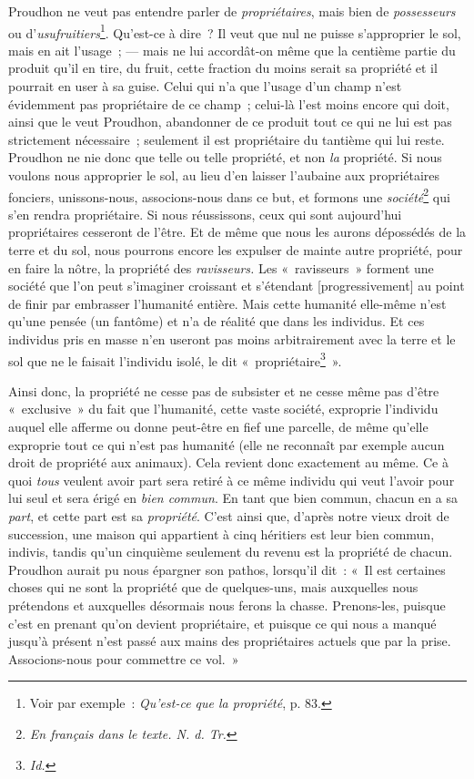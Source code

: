 \documentclass[french,twoside]{book} %
\newcommand\corr[1]{#1}
\begin{document}
Proudhon ne veut pas entendre parler de \emph{propriétaires}, mais bien de \emph{possesseurs} ou d’\emph{usufruitiers}\footnote{ \noindent Voir par exemple : \emph{Qu’est-ce que la propriété}, p. 83.
 }.  Qu’est-ce à dire ? Il veut que nul ne puisse s’approprier le sol, mais en ait l’usage ; — mais ne lui accordât-on même que la centième partie du produit qu’il en tire, du fruit, cette fraction du moins serait sa propriété et il pourrait en user à sa guise. Celui qui n’a que l’usage d’un champ n’est évidemment pas propriétaire de ce champ ; celui-là l’est moins encore qui doit, ainsi que le veut Proudhon, abandonner de ce produit tout ce qui ne lui est pas strictement nécessaire ; seulement il est propriétaire du tantième qui lui reste. Proudhon ne nie donc que telle ou telle propriété, et non \emph{la} propriété. Si nous voulons nous approprier le sol, au lieu d’en laisser l’aubaine aux propriétaires fonciers, unissons-nous, associons-nous dans ce but, et formons une \emph{société}\footnote{ \noindent \emph{En français dans le texte. N. d. Tr.}
 } qui s’en rendra propriétaire. Si nous réussissons, ceux qui sont aujourd’hui propriétaires cesseront de l’être. Et de même que nous les aurons dépossédés de la terre et du sol, nous pourrons encore les expulser de mainte autre propriété, pour en faire la nôtre, la propriété des \emph{ravisseurs.} Les « ravisseurs » forment une société que l’on peut s’imaginer croissant et s’étendant [{\corr progressivement}] au point de finir par embrasser l’humanité entière. Mais cette humanité elle-même n’est qu’une pensée (un fantôme) et n’a de réalité que dans les individus. Et ces individus pris en masse n’en useront pas moins arbitrairement avec la terre et le sol que ne le faisait l’individu isolé, le dit « propriétaire\footnote{ \noindent \emph{Id.}
 } ».\par
Ainsi donc, la propriété ne cesse pas de subsister et ne cesse même pas d’être « exclusive » du fait que l’humanité, cette vaste société, exproprie l’individu auquel elle afferme ou donne peut-être en fief une parcelle, de même qu’elle exproprie tout ce qui n’est pas humanité (elle ne reconnaît par exemple aucun droit de propriété aux animaux). Cela revient donc exactement  au même. Ce à quoi \emph{tous} veulent avoir part sera retiré à ce même individu qui veut l’avoir pour lui seul et sera érigé en \emph{bien commun}. En tant que bien commun, chacun en a sa \emph{part}, et cette part est sa \emph{propriété}. C’est ainsi que, d’après notre vieux droit de succession, une maison qui appartient à cinq héritiers est leur bien commun, indivis, tandis qu’un cinquième seulement du revenu est la propriété de chacun. Proudhon aurait pu nous épargner son pathos, lorsqu’il dit : « Il est certaines choses qui ne sont la propriété que de quelques-uns, mais auxquelles nous prétendons et auxquelles désormais nous ferons la chasse. Prenons-les, puisque c’est en prenant qu’on devient propriétaire, et puisque ce qui nous a manqué jusqu’à présent n’est passé aux mains des propriétaires actuels que par la prise. Associons-nous pour commettre ce vol. »\par
\end{document}
